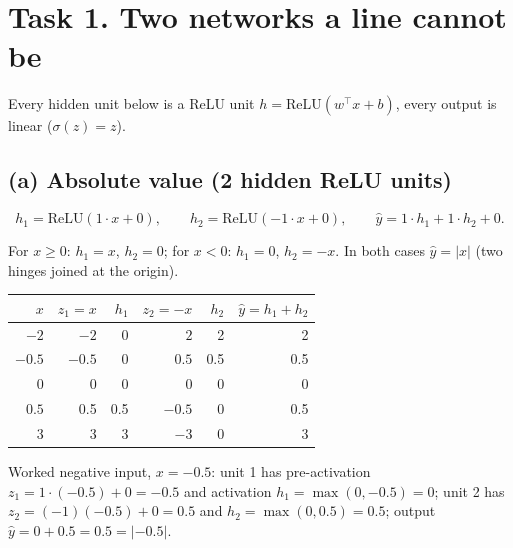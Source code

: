 \section*{Task 1. Two networks a line cannot be}
Every hidden unit below is a ReLU unit $h=\mathrm{ReLU}(w^\top x+b)$, every output is linear ($\sigma(z)=z$).

\subsection*{(a) Absolute value \hfill (2 hidden ReLU units)}
\[
h_1=\mathrm{ReLU}(1\cdot x+0),\qquad h_2=\mathrm{ReLU}(-1\cdot x+0),\qquad \hat y = 1\cdot h_1+1\cdot h_2+0 .
\]
\begin{center}
\end{center}
For $x\ge0$: $h_1=x$, $h_2=0$; for $x<0$: $h_1=0$, $h_2=-x$. In both cases $\hat y=|x|$ (two hinges joined at the origin).

\begin{center}
\begin{tabular}{@{}rrrrrr@{}}\toprule
$x$ & $z_1=x$ & $h_1$ & $z_2=-x$ & $h_2$ & $\hat y=h_1+h_2$\\\midrule
$-2$   & $-2$   & 0   & $2$    & 2   & 2\\
$-0.5$ & $-0.5$ & 0   & $0.5$  & 0.5 & 0.5\\
$0$    & 0      & 0   & 0      & 0   & 0\\
$0.5$  & 0.5    & 0.5 & $-0.5$ & 0   & 0.5\\
$3$    & 3      & 3   & $-3$   & 0   & 3\\\bottomrule
\end{tabular}
\end{center}
Worked negative input, $x=-0.5$: unit 1 has pre-activation $z_1=1\cdot(-0.5)+0=-0.5$ and activation $h_1=\max(0,-0.5)=0$;
unit 2 has $z_2=(-1)(-0.5)+0=0.5$ and $h_2=\max(0,0.5)=0.5$; output $\hat y=0+0.5=0.5=|-0.5|$.

